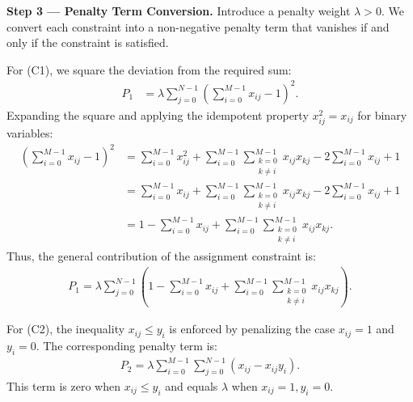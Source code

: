 \documentclass[12pt]{article}
\begin{document}
\textbf{Step 3 --- Penalty Term Conversion.}
Introduce a penalty weight $\lambda > 0$. We convert each constraint into a non-negative penalty term that vanishes if and only if the constraint is satisfied.

For (C1), we square the deviation from the required sum:
\begin{align}
P_1 &= \lambda \sum_{j=0}^{N-1} \left( \sum_{i=0}^{M-1} x_{ij} - 1 \right)^2.
\end{align}
Expanding the square and applying the idempotent property $x_{ij}^2 = x_{ij}$ for binary variables:
\begin{align}
\left( \sum_{i=0}^{M-1} x_{ij} - 1 \right)^2 &= \sum_{i=0}^{M-1} x_{ij}^2 + \sum_{i=0}^{M-1} \sum_{\substack{k=0 \\ k \neq i}}^{M-1} x_{ij} x_{kj} - 2 \sum_{i=0}^{M-1} x_{ij} + 1 \nonumber \\
&= \sum_{i=0}^{M-1} x_{ij} + \sum_{i=0}^{M-1} \sum_{\substack{k=0 \\ k \neq i}}^{M-1} x_{ij} x_{kj} - 2 \sum_{i=0}^{M-1} x_{ij} + 1 \nonumber \\
&= 1 - \sum_{i=0}^{M-1} x_{ij} + \sum_{i=0}^{M-1} \sum_{\substack{k=0 \\ k \neq i}}^{M-1} x_{ij} x_{kj}.
\end{align}
Thus, the general contribution of the assignment constraint is:
\begin{align}
P_1 = \lambda \sum_{j=0}^{N-1} \left( 1 - \sum_{i=0}^{M-1} x_{ij} + \sum_{i=0}^{M-1} \sum_{\substack{k=0 \\ k \neq i}}^{M-1} x_{ij} x_{kj} \right).
\end{align}

For (C2), the inequality $x_{ij} \le y_i$ is enforced by penalizing the case $x_{ij}=1$ and $y_i=0$. The corresponding penalty term is:
\begin{align}
P_2 = \lambda \sum_{i=0}^{M-1} \sum_{j=0}^{N-1} (x_{ij} - x_{ij} y_i).
\end{align}
This term is zero when $x_{ij} \le y_i$ and equals $\lambda$ when $x_{ij}=1, y_i=0$.
\end{document}
